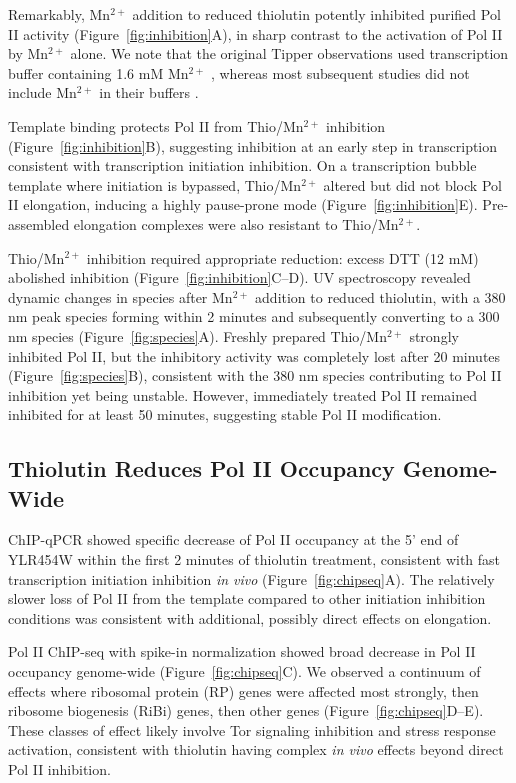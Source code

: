 \documentclass[11pt]{article}
\begin{document}
Remarkably, Mn$^{2+}$ addition to reduced thiolutin potently inhibited purified Pol II activity (Figure~\ref{fig:inhibition}A), in sharp contrast to the activation of Pol II by Mn$^{2+}$ alone. We note that the original Tipper observations used transcription buffer containing 1.6 mM Mn$^{2+}$ \citep{Tipper1973}, whereas most subsequent studies did not include Mn$^{2+}$ in their buffers \citep{Lauber2021,Chan2017}.

Template binding protects Pol II from Thio/Mn$^{2+}$ inhibition (Figure~\ref{fig:inhibition}B), suggesting inhibition at an early step in transcription consistent with transcription initiation inhibition. On a transcription bubble template where initiation is bypassed, Thio/Mn$^{2+}$ altered but did not block Pol II elongation, inducing a highly pause-prone mode (Figure~\ref{fig:inhibition}E). Pre-assembled elongation complexes were also resistant to Thio/Mn$^{2+}$.

Thio/Mn$^{2+}$ inhibition required appropriate reduction: excess DTT (12 mM) abolished inhibition (Figure~\ref{fig:inhibition}C--D). UV spectroscopy revealed dynamic changes in species after Mn$^{2+}$ addition to reduced thiolutin, with a 380 nm peak species forming within 2 minutes and subsequently converting to a 300 nm species (Figure~\ref{fig:species}A). Freshly prepared Thio/Mn$^{2+}$ strongly inhibited Pol II, but the inhibitory activity was completely lost after 20 minutes (Figure~\ref{fig:species}B), consistent with the 380 nm species contributing to Pol II inhibition yet being unstable. However, immediately treated Pol II remained inhibited for at least 50 minutes, suggesting stable Pol II modification.

\subsection{Thiolutin Reduces Pol II Occupancy Genome-Wide}

ChIP-qPCR showed specific decrease of Pol II occupancy at the 5' end of YLR454W within the first 2 minutes of thiolutin treatment, consistent with fast transcription initiation inhibition \textit{in vivo} (Figure~\ref{fig:chipseq}A). The relatively slower loss of Pol II from the template compared to other initiation inhibition conditions was consistent with additional, possibly direct effects on elongation.

Pol II ChIP-seq with spike-in normalization showed broad decrease in Pol II occupancy genome-wide (Figure~\ref{fig:chipseq}C). We observed a continuum of effects where ribosomal protein (RP) genes were affected most strongly, then ribosome biogenesis (RiBi) genes, then other genes (Figure~\ref{fig:chipseq}D--E). These classes of effect likely involve Tor signaling inhibition and stress response activation, consistent with thiolutin having complex \textit{in vivo} effects beyond direct Pol II inhibition.
\end{document}
